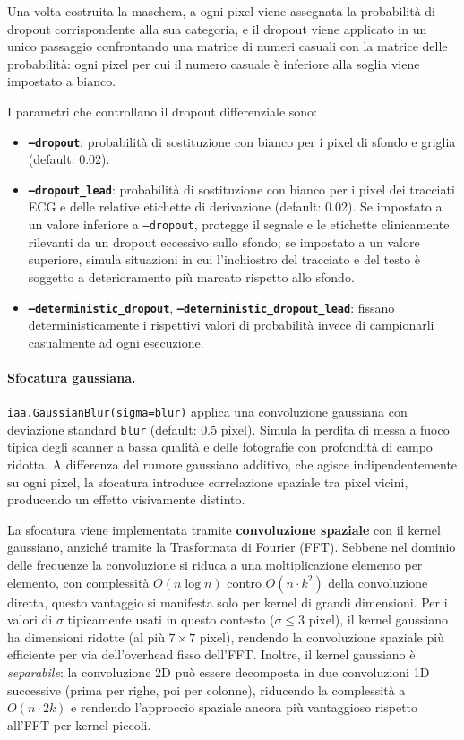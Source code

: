 Una volta costruita la maschera, a ogni pixel viene assegnata la probabilità di dropout corrispondente alla sua categoria, e il dropout viene applicato in un unico passaggio confrontando una matrice di numeri casuali con la matrice delle probabilità: ogni pixel per cui il numero casuale è inferiore alla soglia viene impostato a bianco.

I parametri che controllano il dropout differenziale sono:
\begin{itemize}
    \item \textbf{\texttt{--dropout}}: probabilità di sostituzione con bianco per i pixel di sfondo e griglia (default: 0.02).
    \item \textbf{\texttt{--dropout\_lead}}: probabilità di sostituzione con bianco per i pixel dei tracciati ECG e delle relative etichette di derivazione (default: 0.02). Se impostato a un valore inferiore a \texttt{--dropout}, protegge il segnale e le etichette clinicamente rilevanti da un dropout eccessivo sullo sfondo; se impostato a un valore superiore, simula situazioni in cui l'inchiostro del tracciato e del testo è soggetto a deterioramento più marcato rispetto allo sfondo.
    \item \textbf{\texttt{--deterministic\_dropout}}, \textbf{\texttt{--deterministic\_dropout\_lead}}: fissano deterministicamente i rispettivi valori di probabilità invece di campionarli casualmente ad ogni esecuzione.
\end{itemize}

\paragraph{Sfocatura gaussiana.} \texttt{iaa.GaussianBlur(sigma=blur)} applica una convoluzione gaussiana con deviazione standard \texttt{blur} (default: 0.5 pixel). Simula la perdita di messa a fuoco tipica degli scanner a bassa qualità e delle fotografie con profondità di campo ridotta. A differenza del rumore gaussiano additivo, che agisce indipendentemente su ogni pixel, la sfocatura introduce correlazione spaziale tra pixel vicini, producendo un effetto visivamente distinto.

La sfocatura viene implementata tramite \textbf{convoluzione spaziale} con il kernel gaussiano, anziché tramite la Trasformata di Fourier (FFT). Sebbene nel dominio delle frequenze la convoluzione si riduca a una moltiplicazione elemento per elemento, con complessità $O(n \log n)$ contro $O(n \cdot k^2)$ della convoluzione diretta, questo vantaggio si manifesta solo per kernel di grandi dimensioni. Per i valori di $\sigma$ tipicamente usati in questo contesto ($\sigma \leq 3$ pixel), il kernel gaussiano ha dimensioni ridotte (al più $7\times7$ pixel), rendendo la convoluzione spaziale più efficiente per via dell'overhead fisso dell'FFT. Inoltre, il kernel gaussiano è \textit{separabile}: la convoluzione 2D può essere decomposta in due convoluzioni 1D successive (prima per righe, poi per colonne), riducendo la complessità a $O(n \cdot 2k)$ e rendendo l'approccio spaziale ancora più vantaggioso rispetto all'FFT per kernel piccoli.

